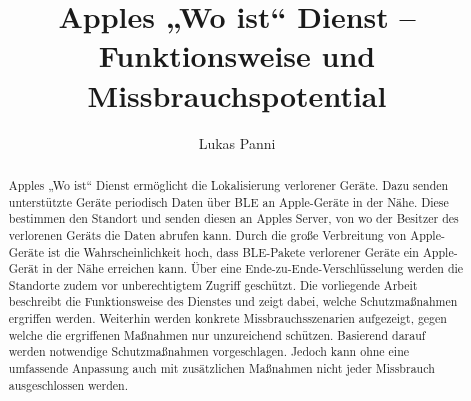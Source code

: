 \documentclass[runningheads]{llncs}
\begin{document}
\title{Apples „Wo ist“ Dienst – Funktionsweise und Missbrauchspotential}


\author{Lukas Panni}


\maketitle              %

\begin{abstract}
Apples „Wo ist“ Dienst ermöglicht die Lokalisierung verlorener Geräte.
Dazu senden unterstützte Geräte periodisch Daten über \ac{BLE} an Apple-Geräte in der Nähe.
Diese bestimmen den Standort und senden diesen an Apples Server, von wo der Besitzer des verlorenen Geräts die Daten abrufen kann.
Durch die große Verbreitung von Apple-Geräte ist die Wahrscheinlichkeit hoch, dass \ac{BLE}-Pakete verlorener Geräte ein Apple-Gerät in der Nähe erreichen kann.
Über eine Ende-zu-Ende-Verschlüsselung werden die Standorte zudem vor unberechtigtem Zugriff geschützt.
Die vorliegende Arbeit beschreibt die Funktionsweise des Dienstes und zeigt dabei, welche Schutzmaßnahmen ergriffen werden.
Weiterhin werden konkrete Missbrauchsszenarien aufgezeigt, gegen welche die ergriffenen Maßnahmen nur unzureichend schützen.
Basierend darauf werden notwendige Schutzmaßnahmen vorgeschlagen.
Jedoch kann ohne eine umfassende Anpassung auch mit zusätzlichen Maßnahmen nicht jeder Missbrauch ausgeschlossen werden.
\end{abstract}




\newpage









\end{document}
